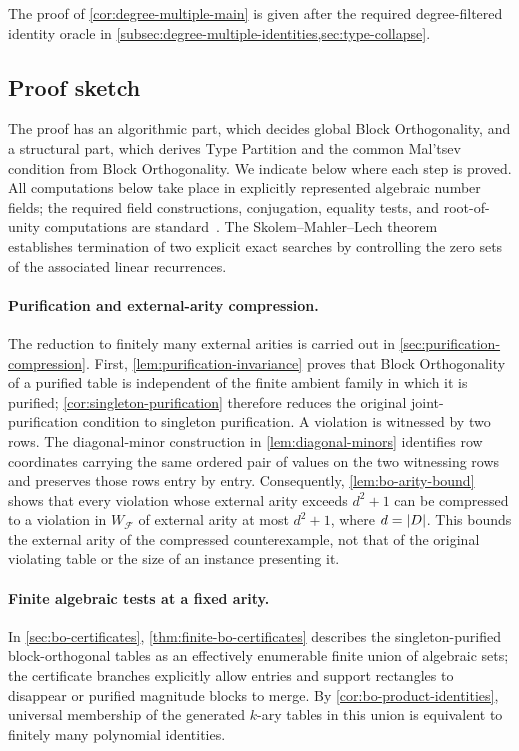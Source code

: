 \documentclass[11pt]{article}
\theoremstyle{plain}
\theoremstyle{definition}
\theoremstyle{remark}
\newcommand{\cF}{\mathcal F}
\DeclarePairedDelimiter{\abs}{\lvert}{\rvert}
\begin{document}
The proof of \cref{cor:degree-multiple-main} is given after the required
degree-filtered identity oracle in
\cref{subsec:degree-multiple-identities,sec:type-collapse}.

\subsection{Proof sketch}
\label{subsec:proof-sketch}

The proof has an algorithmic part, which decides global Block Orthogonality,
and a structural part, which derives Type Partition and the common Mal'tsev
condition from Block Orthogonality.  We indicate below where each step is
proved.
All computations below take place in explicitly represented algebraic number
fields; the required field constructions, conjugation, equality tests, and
root-of-unity computations are standard~\cite{Cohen1993}.  The
Skolem--Mahler--Lech theorem~\cite{Lech1953} establishes termination of two
explicit exact searches by controlling the zero sets of the associated
linear recurrences.

\paragraph{Purification and external-arity compression.}
The reduction to finitely many external arities is carried out in
\cref{sec:purification-compression}.  First,
\cref{lem:purification-invariance} proves that Block Orthogonality of a
purified table is independent of the finite ambient family in which it is
purified; \cref{cor:singleton-purification} therefore reduces the original
joint-purification condition to singleton purification.  A violation is
witnessed by two rows.  The diagonal-minor construction in
\cref{lem:diagonal-minors} identifies row coordinates carrying the same
ordered pair of values on the two witnessing rows and preserves those rows
entry by entry.  Consequently, \cref{lem:bo-arity-bound} shows that every
violation whose external arity exceeds $d^2+1$ can be compressed to a
violation in $W_{\cF}$ of external arity at most $d^2+1$, where
$d=\abs D$.  This bounds the external arity of the compressed
counterexample, not that of the original violating table or the size of an
instance presenting it.

\paragraph{Finite algebraic tests at a fixed arity.}
In \cref{sec:bo-certificates},
\cref{thm:finite-bo-certificates} describes the singleton-purified
block-orthogonal tables as an effectively enumerable finite union of
algebraic sets; the certificate branches explicitly allow entries and
support rectangles to disappear or purified magnitude blocks to merge.
By \cref{cor:bo-product-identities}, universal membership of the generated
$k$-ary tables in this union is equivalent to finitely many polynomial
identities.
\end{document}
